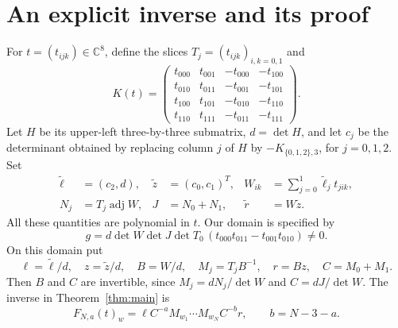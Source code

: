 \documentclass[11pt]{article}
\newcommand{\C}{\mathbb C}
\newcommand{\adj}{\operatorname{adj}}
\begin{document}
\section{An explicit inverse and its proof}
For $t=(t_{ijk})\in\C^8$, define the slices $T_j=(t_{ijk})_{i,k=0,1}$ and
\begin{equation}\label{eq:kernel}
 K(t)=\begin{pmatrix}
 t_{000}&t_{001}&-t_{000}&-t_{100}\\
 t_{010}&t_{011}&-t_{001}&-t_{101}\\
 t_{100}&t_{101}&-t_{010}&-t_{110}\\
 t_{110}&t_{111}&-t_{011}&-t_{111}
 \end{pmatrix}.
\end{equation}
Let $H$ be its upper-left three-by-three submatrix, $d=\det H$, and
let $c_j$ be the determinant obtained by replacing column $j$ of $H$
by $-K_{\{0,1,2\},3}$, for $j=0,1,2$. Set
\begin{align}
 \widetilde\ell&=(c_2,d),& \widetilde z&=(c_0,c_1)^T,&
 W_{ik}&=\sum_{j=0}^1\widetilde\ell_jt_{jik},\label{eq:raw}\\
 N_j&=T_j\adj W,&J&=N_0+N_1,&\widetilde r&=W\widetilde z.\nonumber
\end{align}
All these quantities are polynomial in $t$. Our domain is specified by
\begin{equation}\label{eq:g}
 g=d\det W\det J\det T_0\,
 (t_{000}t_{011}-t_{001}t_{010})\ne0.
\end{equation}
On this domain put
\begin{equation}\label{eq:reconstruction}
 \ell=\widetilde\ell/d,\quad z=\widetilde z/d,\quad B=W/d,
 \quad M_j=T_jB^{-1},\quad r=Bz,\quad C=M_0+M_1.
\end{equation}
Then $B$ and $C$ are invertible, since
$M_j=dN_j/\det W$ and $C=dJ/\det W$. The inverse in Theorem~\ref{thm:main} is
\begin{equation}\label{eq:inverse}
 F_{N,a}(t)_w=\ell C^{-a}M_{w_1}\cdots M_{w_N}C^{-b}r,
 \qquad b=N-3-a.
\end{equation}
\end{document}
